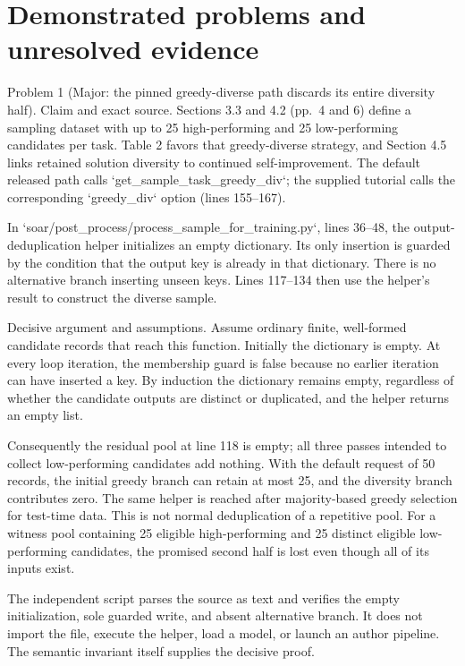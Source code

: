\documentclass[10pt]{article}
\begin{document}
\section*{Demonstrated problems and unresolved evidence}
Problem 1 (Major: the pinned greedy-diverse path discards its entire diversity half).  Claim and exact source. Sections 3.3 and 4.2 (pp. 4 and 6) define a sampling dataset with up to 25 high-performing and 25 low-performing candidates per task. Table 2 favors that greedy-diverse strategy, and Section 4.5 links retained solution diversity to continued self-improvement. The default released path calls `get\_sample\_task\_greedy\_div`; the supplied tutorial calls the corresponding `greedy\_div` option (lines 155–167).\par
In `soar/post\_process/process\_sample\_for\_training.py`, lines 36–48, the output-deduplication helper initializes an empty dictionary. Its only insertion is guarded by the condition that the output key is already in that dictionary. There is no alternative branch inserting unseen keys. Lines 117–134 then use the helper’s result to construct the diverse sample.\par
Decisive argument and assumptions. Assume ordinary finite, well-formed candidate records that reach this function. Initially the dictionary is empty. At every loop iteration, the membership guard is false because no earlier iteration can have inserted a key. By induction the dictionary remains empty, regardless of whether the candidate outputs are distinct or duplicated, and the helper returns an empty list.\par
Consequently the residual pool at line 118 is empty; all three passes intended to collect low-performing candidates add nothing. With the default request of 50 records, the initial greedy branch can retain at most 25, and the diversity branch contributes zero. The same helper is reached after majority-based greedy selection for test-time data. This is not normal deduplication of a repetitive pool. For a witness pool containing 25 eligible high-performing and 25 distinct eligible low-performing candidates, the promised second half is lost even though all of its inputs exist.\par
The independent script parses the source as text and verifies the empty initialization, sole guarded write, and absent alternative branch. It does not import the file, execute the helper, load a model, or launch an author pipeline. The semantic invariant itself supplies the decisive proof.\par
\end{document}
